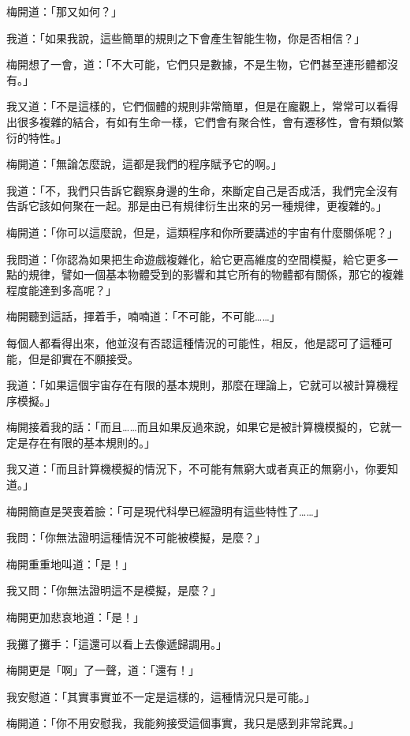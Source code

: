 
梅開道：「那又如何？」

我道：「如果我說，這些簡單的規則之下會產生智能生物，你是否相信？」

梅開想了一會，道：「不大可能，它們只是數據，不是生物，它們甚至連形體都沒有。」

我又道：「不是這樣的，它們個體的規則非常簡單，但是在龐觀上，常常可以看得出很多複雜的結合，有如有生命一樣，它們會有聚合性，會有遷移性，會有類似繁衍的特性。」

梅開道：「無論怎麼說，這都是我們的程序賦予它的啊。」

我道：「不，我們只告訴它觀察身邊的生命，來斷定自己是否成活，我們完全沒有告訴它該如何聚在一起。那是由已有規律衍生出來的另一種規律，更複雜的。」

梅開道：「你可以這麼說，但是，這類程序和你所要講述的宇宙有什麼關係呢？」

我問道：「你認為如果把生命遊戲複雜化，給它更高維度的空間模擬，給它更多一點的規律，譬如一個基本物體受到的影響和其它所有的物體都有關係，那它的複雜程度能達到多高呢？」


梅開聽到這話，揮着手，喃喃道：「不可能，不可能……」

每個人都看得出來，他並沒有否認這種情況的可能性，相反，他是認可了這種可能，但是卻實在不願接受。

我道：「如果這個宇宙存在有限的基本規則，那麼在理論上，它就可以被計算機程序模擬。」

梅開接着我的話：「而且……而且如果反過來說，如果它是被計算機模擬的，它就一定是存在有限的基本規則的。」

我又道：「而且計算機模擬的情況下，不可能有無窮大或者真正的無窮小，你要知道。」

梅開簡直是哭喪着臉：「可是現代科學已經證明有這些特性了……」

我問：「你無法證明這種情況不可能被模擬，是麼？」

梅開重重地叫道：「是！」

我又問：「你無法證明這不是模擬，是麼？」

梅開更加悲哀地道：「是！」

我攤了攤手：「這還可以看上去像遞歸調用。」

梅開更是「啊」了一聲，道：「還有！」

我安慰道：「其實事實並不一定是這樣的，這種情況只是可能。」

梅開道：「你不用安慰我，我能夠接受這個事實，我只是感到非常詫異。」

